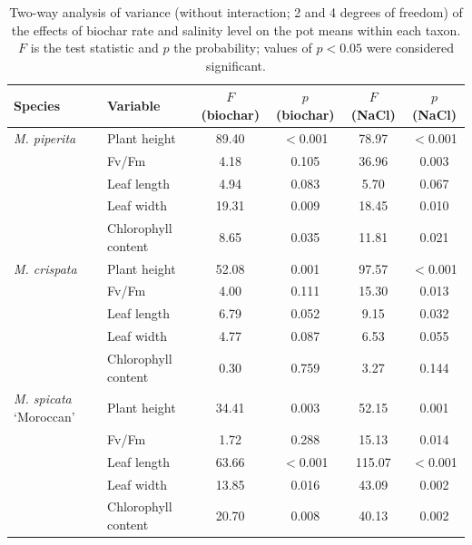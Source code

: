 \begin{table}[htbp]
  \centering
  \small
  \caption[Two-way ANOVA of biochar rate and salinity]{Two-way analysis of variance (without interaction; 2 and 4 degrees of freedom) of the effects of biochar rate and salinity level on the pot means within each taxon. $F$ is the test statistic and $p$ the probability; values of $p<0.05$ were considered significant.}
  \label{tab:anova}
  \begin{tabular}{ll S[table-format=3.2,round-mode=places,round-precision=2] c S[table-format=3.2,round-mode=places,round-precision=2] c}
    \toprule
    Species & Variable & {$F$ (biochar)} & {$p$ (biochar)} & {$F$ (NaCl)} & {$p$ (NaCl)} \\
    \midrule
    \textit{M. piperita} & Plant height & 89.40 & $<$0.001 & 78.97 & $<$0.001 \\
     & Fv/Fm & 4.18 & 0.105 & 36.96 & 0.003 \\
     & Leaf length & 4.94 & 0.083 & 5.70 & 0.067 \\
     & Leaf width & 19.31 & 0.009 & 18.45 & 0.010 \\
     & Chlorophyll content & 8.65 & 0.035 & 11.81 & 0.021 \\
    \midrule
    \textit{M. crispata} & Plant height & 52.08 & 0.001 & 97.57 & $<$0.001 \\
     & Fv/Fm & 4.00 & 0.111 & 15.30 & 0.013 \\
     & Leaf length & 6.79 & 0.052 & 9.15 & 0.032 \\
     & Leaf width & 4.77 & 0.087 & 6.53 & 0.055 \\
     & Chlorophyll content & 0.30 & 0.759 & 3.27 & 0.144 \\
    \midrule
    \textit{M. spicata} `Moroccan' & Plant height & 34.41 & 0.003 & 52.15 & 0.001 \\
     & Fv/Fm & 1.72 & 0.288 & 15.13 & 0.014 \\
     & Leaf length & 63.66 & $<$0.001 & 115.07 & $<$0.001 \\
     & Leaf width & 13.85 & 0.016 & 43.09 & 0.002 \\
     & Chlorophyll content & 20.70 & 0.008 & 40.13 & 0.002 \\
    \bottomrule
  \end{tabular}
\end{table}

